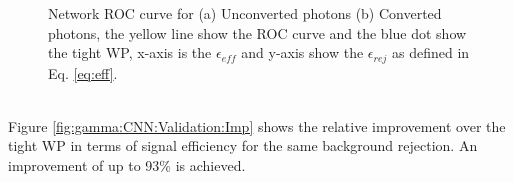 \begin{figure}[htbp]
    \centering
	\begin{tcolorbox}[colback=black!5!white,colframe=white!75!black]
    \caption{Network ROC curve for (a) Unconverted photons (b) Converted photons, the yellow line show the ROC curve and the blue dot show the tight WP, x-axis is the $\epsilon_{eff}$ and y-axis show the $\epsilon_{rej}$ as defined in Eq. \ref{eq:eff}.}
    \label{fig:gamma:CNN:Validation:ROC}
    \end{tcolorbox}
    
\end{figure}
\\
Figure \ref{fig:gamma:CNN:Validation:Imp} shows the relative improvement over the tight WP in terms of signal efficiency for the same background rejection. An improvement of up to 93\% is achieved. 
